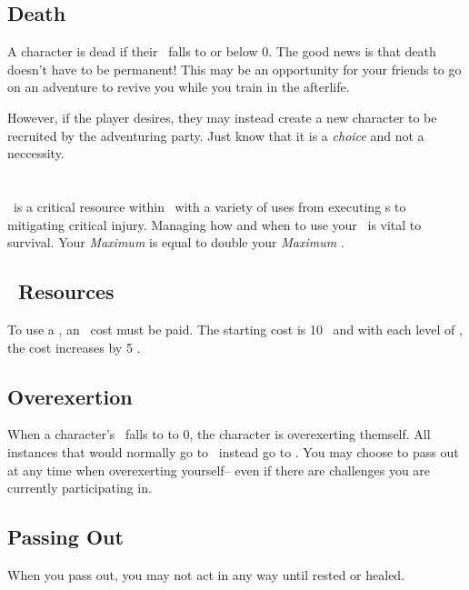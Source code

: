 \subsection{Death}\label{subsec:death}
A character is dead if their \HPful\ falls to or below 0. The good news is that death doesn't have to be permanent!
This may be an opportunity for your friends to go on an adventure to revive you while you train in the afterlife.

However, if the player desires, they may instead create a new character
to be recruited by the adventuring party. Just know that it is a \emph{choice}
and not a neccessity.

\section{\ENful\index{\ENful}}\label{sec:energy}
\ENful\ is a critical resource within \gametitlemini\ with a variety of uses from executing \techn s to mitigating critical injury.
Managing how and when to use your \ENful\ is vital to survival. Your \emph{Maximum \ENful} is equal to double your \emph{Maximum \HPful}.

\subsection{\techn\ Resources}\index{\techn}\label{subsec:tech_resources}
To use a \techn{}, an \ENful\ cost must be paid. The starting cost is 10 \EN\ and with each level of \advancement{}\index{\advancement}, the cost increases by 5 \EN.

\subsection{Overexertion}\label{subsec:exhaustion}
When a character's \ENful\ falls to to 0, the character is overexerting themself. All instances that would normally go to \ENful\ instead go to \HPful . You may choose to pass out at any time when overexerting yourself-- even if there are challenges you are currently participating in.

\subsection{Passing Out}\label{subsec:pass_out}
When you pass out, you may not act in any way until rested or healed.

